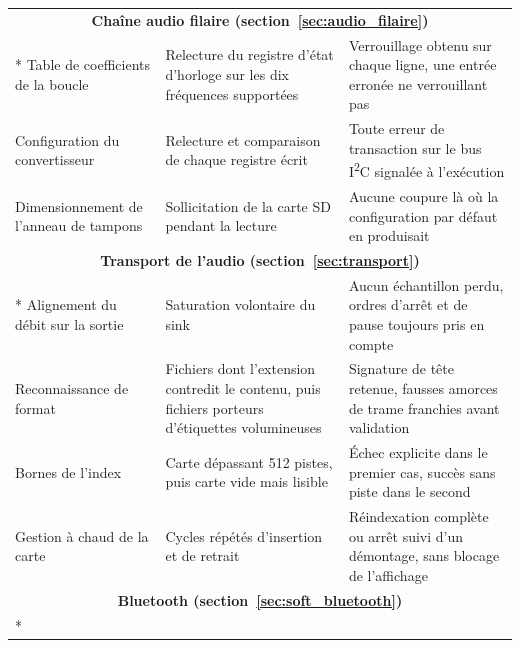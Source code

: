 \begin{longtable}{p{} p{} p{}}
    \hline
    \multicolumn{3}{c}{\textbf{Chaîne audio filaire (section~\ref{sec:audio_filaire})}}                                                                                                                                                       \\*
    \hline
    Table de coefficients de la boucle        & Relecture du registre d'état d'horloge sur les dix fréquences supportées                         & Verrouillage obtenu sur chaque ligne, une entrée erronée ne verrouillant pas               \\
    Configuration du convertisseur            & Relecture et comparaison de chaque registre écrit                                                & Toute erreur de transaction sur le bus I\textsuperscript{2}C signalée à l'exécution        \\
    Dimensionnement de l'anneau de tampons    & Sollicitation de la carte SD pendant la lecture                                                  & Aucune coupure là où la configuration par défaut en produisait                             \\
    \hline
    \multicolumn{3}{c}{\textbf{Transport de l'audio (section~\ref{sec:transport})}}                                                                                                                                                           \\*
    \hline
    Alignement du débit sur la sortie         & Saturation volontaire du sink                                                                    & Aucun échantillon perdu, ordres d'arrêt et de pause toujours pris en compte                \\
    Reconnaissance de format                  & Fichiers dont l'extension contredit le contenu, puis fichiers porteurs d'étiquettes volumineuses & Signature de tête retenue, fausses amorces de trame franchies avant validation             \\
    Bornes de l'index                         & Carte dépassant 512 pistes, puis carte vide mais lisible                                         & Échec explicite dans le premier cas, succès sans piste dans le second                      \\
    Gestion à chaud de la carte               & Cycles répétés d'insertion et de retrait                                                         & Réindexation complète ou arrêt suivi d'un démontage, sans blocage de l'affichage           \\
    \hline
    \multicolumn{3}{c}{\textbf{Bluetooth (section~\ref{sec:soft_bluetooth})}}                                                                                                                                                                 \\*

\end{longtable}
